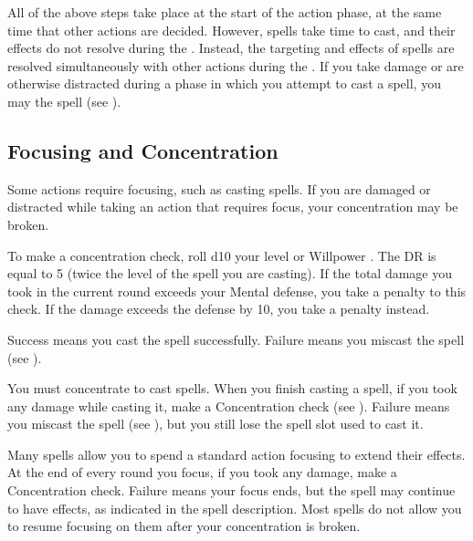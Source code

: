         All of the above steps take place at the start of the action phase, at the same time that other actions are decided.
        However, spells take time to cast, and their effects do not resolve during the .
        Instead, the targeting and effects of spells are resolved simultaneously with other actions during the .
        If you take damage or are otherwise distracted during a phase in which you attempt to cast a spell, you may  the spell (see ).

    \subsection{Focusing and Concentration}\label{Concentration}\label{Focus}\label{Focusing and Concentration}

        Some actions require focusing, such as casting spells.
        If you are damaged or distracted while taking an action that requires focus, your concentration may be broken.

        \label{Concentration Checks}

        To make a concentration check, roll d10 \add your level or Willpower \sub {}.
        The DR is equal to 5 \add (twice the level of the spell you are casting).
        If the total damage you took in the current round exceeds your Mental defense, you take a  penalty to this check.
        If the damage exceeds the defense by 10, you take a  penalty instead.

        Success means you cast the spell successfully.
        Failure means you miscast the spell (see ).

         You must concentrate to cast spells.
        When you finish casting a spell, if you took any damage while casting it, make a Concentration check (see ). Failure means you miscast the spell (see ), but you still lose the spell slot used to cast it.

         Many spells allow you to spend a standard action focusing to extend their effects.
        At the end of every round you focus, if you took any damage, make a Concentration check.
        Failure means your focus ends, but the spell may continue to have effects, as indicated in the spell description.
        Most spells do not allow you to resume focusing on them after your concentration is broken.

